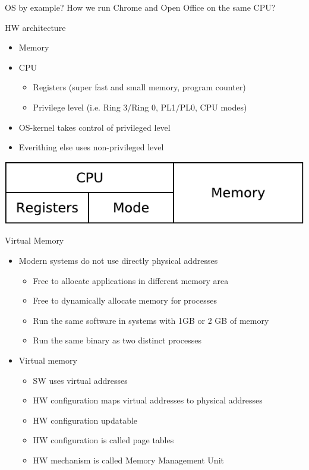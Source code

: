 \documentclass{beamer}
\begin{document}
\begin{frame}{OS by example?}
  How we run Chrome and Open Office on the same CPU?
\end{frame}

\begin{frame}{HW architecture}
  \begin{itemize}
  \item Memory
  \item CPU
    \begin{itemize}
    \item Registers (super fast and small memory, program counter)
    \item Privilege level (i.e. Ring 3/Ring 0, PL1/PL0, CPU modes)
    \end{itemize}
  \item OS-kernel takes control of privileged level
  \item Everithing else uses non-privileged level
  \end{itemize}
  \includegraphics[width=0.5\linewidth]{hw}
\end{frame}

\begin{frame}{Virtual Memory}
  \begin{itemize}
  \item Modern systems do not use directly physical addresses
    \begin{itemize}
    \item Free to allocate applications in different memory area
    \item Free to dynamically allocate memory for processes
    \item Run the same software in systems with 1GB or 2 GB of memory
    \item Run the same binary as two distinct processes
    \end{itemize}
  \item Virtual memory
    \begin{itemize}
    \item SW uses virtual addresses
    \item HW configuration maps virtual addresses to physical addresses
    \item HW configuration updatable
    \item HW configuration is called page tables
    \item HW mechanism is called Memory Management Unit
    \end{itemize}
  \end{itemize}
\end{frame}
\end{document}
